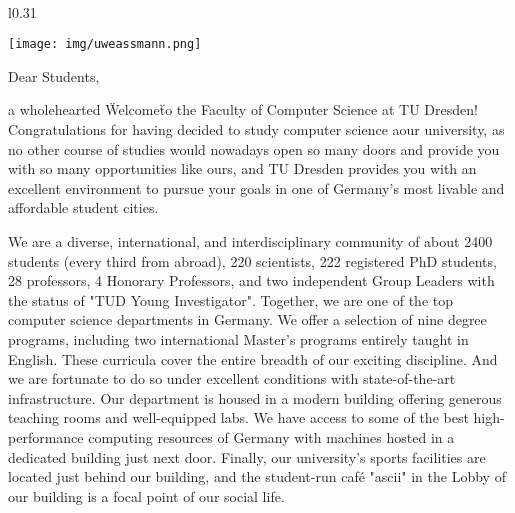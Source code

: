 \thispagestyle{empty}
\
\pagebreak


\begin{wrapfigure}{l}{0.31\textwidth}
  \vspace{-12pt}
  \begin{centering}
    \texttt{[image: img/uweassmann.png]}
  \end{centering}
  \vspace{-15pt}
\end{wrapfigure}

{\fontsize{10pt}{11}\selectfont
Dear Students,

a wholehearted \"Welcome\" to the Faculty of Computer Science at TU Dresden! Congratulations for having decided to study computer science aour university, as no other course of studies would nowadays open so many doors and provide you with so many opportunities like ours, and TU Dresden provides you with an excellent environment to pursue your goals in one of Germany’s most livable and affordable student cities.

We are a diverse, international, and interdisciplinary community of about 2400 students (every third from abroad), 220 scientists, 222 registered PhD students, 28 professors, 4 Honorary Professors, and two independent Group Leaders with the status of "TUD Young Investigator". Together, we are one of the top computer science departments in Germany. We offer a selection of nine degree programs, including two international Master’s programs entirely taught in English. These curricula cover the entire breadth of our exciting discipline. And we are fortunate to do so under excellent conditions with state-of-the-art infrastructure. Our department is housed in a modern building offering generous teaching rooms and well-equipped labs. We have access to some of the best high-performance computing resources of Germany with machines hosted in a dedicated building just next door. Finally, our university's sports facilities are located just behind our building, and the student-run café "ascii" in the Lobby of our building is a focal point of our social life.

}
